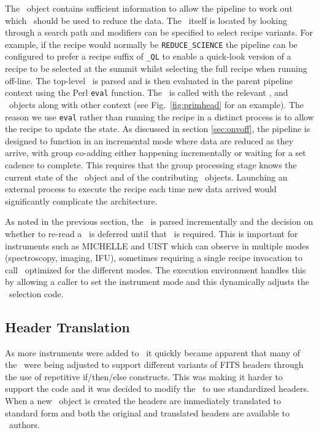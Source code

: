 \documentclass[final,authoryear,5p,times,twocolumn]{elsarticle}
\begin{document}
The \Frame\ object contains sufficient information to allow the
pipeline to work out which \recipe\ should be used to reduce the
data. The \recipe\ itself is located by looking through a search path
and modifiers can be specified to select recipe variants. For example,
if the recipe would normally be \texttt{REDUCE\_SCIENCE} the pipeline
can be configured to prefer a recipe suffix of \texttt{\_QL} to
enable a quick-look version of a recipe to be selected at the summit
whilst selecting the full recipe when running off-line.
The top-level \recipe\ is parsed and is then evaluated in the
parent pipeline context using the Perl \texttt{eval} function. The
\recipe\ is called with the relevant \Frame, and \Group\ objects along
with other context (see Fig.\ \ref{fig:primhead} for an example). The
reason we use \texttt{eval} rather than running the recipe in a
distinct process is to allow the recipe to update the state. As
discussed in section \ref{sec:onvoff}, the pipeline is designed to
function in an incremental mode where data are reduced as they arrive,
with group co-adding either happening incrementally or waiting for a
set cadence to complete. This requires that the group processing stage
knows the current state of the \Group\ object and of the contributing
\Frame\ objects. Launching an external process to execute the
recipe each time new data arrived would significantly complicate the
architecture.

As noted in the previous section, the \recipe\ is parsed incrementally
and the decision on whether to re-read a \primitive\ is deferred until
that \primitive\ is required. This is important for instruments such
as MICHELLE and UIST which can observe in multiple modes
(spectroscopy, imaging, IFU), sometimes
requiring a single recipe invocation to call \primitives\ optimized
for the different modes. The execution environment handles this by
allowing a caller to set the instrument mode and this dynamically
adjusts the \primitive\ selection code.

\subsection{Header Translation}

As more instruments were added to \oracdr\ it quickly became apparent
that many of the \primitives\ were being adjusted to support different
variants of FITS headers through the use of repetitive if/then/else
constructs. This was making it harder to support the code and it was
decided to modify the \primitives\ to use standardized headers. When a
new \Frame\ object is created the headers are immediately translated
to standard form and both the original and translated headers are
available to \primitive\ authors.
\end{document}
